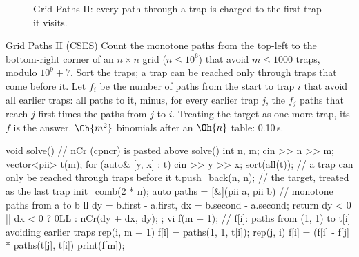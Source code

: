 \begin{figure}[htbp]
\centering
{}
\caption{Grid Paths II: every path through a trap is charged to the first trap it visits.}
\label{fig:gridtraps}
\end{figure}

\begin{problem}{Grid Paths II (CSES)}
Count the monotone paths from the top-left to the bottom-right corner of an $n \times n$ grid ($n \le 10^6$) that avoid $m \le 1000$
traps, modulo $10^9 + 7$.
\solution Sort the traps; a trap can be reached only through traps that come before it. Let $f_i$ be the number of paths from the
start to trap $i$ that avoid all earlier traps: all paths to it, minus, for every earlier trap $j$, the $f_j$ paths that reach $j$ first
times the paths from $j$ to $i$. Treating the target as one more trap, its $f$ is the answer. $\Oh{m^2}$ binomials after an $\Oh{n}$
table: 0.10\,s.
\end{problem}

\begin{code}
void solve() {  // nCr (cpncr) is pasted above solve()
    int n, m;
    cin >> n >> m;
    vector<pii> t(m);
    for (auto& [y, x] : t) cin >> y >> x;
    sort(all(t));  // a trap can only be reached through traps before it
    t.push_back({n, n});  // the target, treated as the last trap
    init_comb(2 * n);
    auto paths = [&](pii a, pii b) {  // monotone paths from a to b
        ll dy = b.first - a.first, dx = b.second - a.second;
        return dy < 0 || dx < 0 ? 0LL : nCr(dy + dx, dy);
    };
    vi f(m + 1);  // f[i]: paths from (1, 1) to t[i] avoiding earlier traps
    rep(i, m + 1) {
        f[i] = paths({1, 1}, t[i]);
        rep(j, i) f[i] = (f[i] - f[j] * paths(t[j], t[i]) %
    }
    print(f[m]);
}
\end{code}

